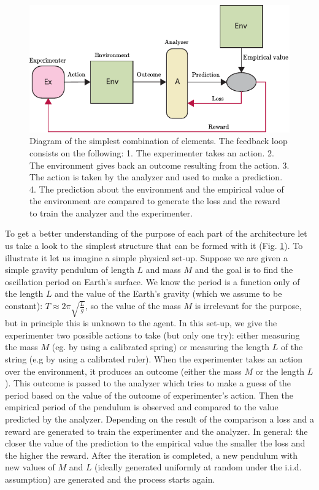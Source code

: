 \documentclass[11pt,a4paper,twoside]{report}
\newcommand{\+}{\textnormal{+} }
\theoremstyle{definition}
\numberwithin{equation}{chapter}
\begin{document}
\begin{figure}
  \centering
  \includegraphics{figures/SimpleSetUp.pdf}
  \caption{Diagram of the simplest combination of elements. The feedback loop
  consists on the following: 1. The experimenter takes an action. 2. The
  environment gives back an outcome resulting from the action. 3. The action is
  taken by the analyzer and used to make a prediction. 4. The prediction about
  the environment and the empirical value of the environment are compared to
  generate the loss and the reward to train the analyzer and the experimenter.}
  \label{fig:simplesetup}
\end{figure}

To get a better understanding of the purpose of each part of the architecture
let us take a look to the simplest structure that can be formed with it (Fig.
\ref{fig:simplesetup}). To illustrate it let us imagine a simple physical
set-up. Suppose we are given a simple gravity pendulum of length $L$ and mass
$M$ and the goal is to find the oscillation period on Earth's surface. We know
the period is a function only of the length $L$ and the value of the Earth's
gravity (which we assume to be constant): $T \approx 2\pi\sqrt{\frac{L}{g}}$, so
the value of the mass $M$ is irrelevant for the purpose, but in principle this
is unknown to the agent. In this set-up, we give the experimenter two possible
actions to take (but only one try): either measuring the mass $M$ (eg. by using
a calibrated spring) or measuring the length $L$ of the string (e.g by using a
calibrated ruler). When the experimenter takes an action over the environment,
it produces an outcome (either the mass $M$ or the length $L$). This outcome is
passed to the analyzer which tries to make a guess of the period based on the
value of the outcome of experimenter's action. Then the empirical period of the
pendulum is observed and compared to the value predicted by the analyzer.
Depending on the result of the comparison a loss and a reward are generated to
train the experimenter and the analyzer. In general: the closer the value of the
prediction to the empirical value the smaller the loss and the higher the
reward. After the iteration is completed, a new pendulum with new values of $M$
and $L$ (ideally generated uniformly at random under the i.i.d. assumption) are
generated and the process starts again.
\end{document}
